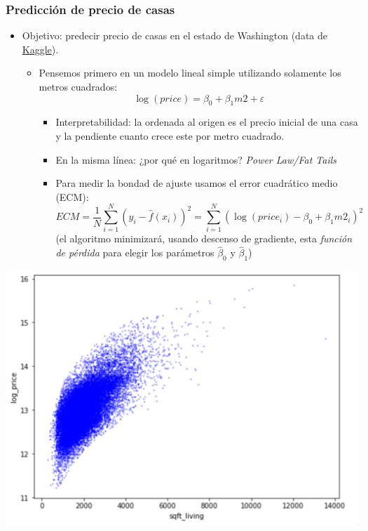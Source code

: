 \documentclass[leqno, 10pt, envcountsect]{beamer}
\numberwithin{equation}{section}
\theoremstyle{definition}
\theoremstyle{example}
\numberwithin{figure}{section}
\numberwithin{table}{section}
\let\olditem\item
\renewcommand{\item}{%
\olditem\vspace{1pt}}
\begin{document}
\begin{frame}
  \frametitle{Predicción de precio de casas}
  \begin{itemize}
    \item Objetivo: predecir precio de casas en el estado de Washington (data de
      \href{https://www.kaggle.com/harlfoxem/housesalesprediction}{Kaggle}).
      \begin{itemize}
        \item Pensemos primero en un modelo lineal simple utilizando solamente
          los metros cuadrados:
          \begin{equation*}
            \log(price) = \beta_{0} + \beta_{1}m2 + \varepsilon
          \end{equation*}
          \begin{itemize}
        \item Interpretabilidad: la ordenada al origen es el precio inicial de
          una casa y la pendiente cuanto crece este por metro cuadrado.
        \item En la misma línea: ¿por qué en logaritmos? \textit{Power Law/Fat
          Tails}
        \item Para medir la bondad de ajuste usamos el error cuadrático
          medio (ECM):
          \begin{equation*}
            ECM = \frac{1}{N} \sum_{i=1}^{N}(y_{i} - \hat{f}(x_{i}))^{2} =
          \sum_{i=1}^{N}(\log(price_{i}) - \beta_{0} + \beta_{1}m2_{i})^{2}
          \end{equation*}
          (el algoritmo minimizará, usando descenso de gradiente, esta
              \textit{función de pérdida} para elegir los parámetros
              $\hat{\beta}_{0}$ y $\hat{\beta}_{1}$)
          \end{itemize}
      \end{itemize}
  \end{itemize}
  \begin{center}
    \includegraphics[scale=0.1]{scatter_regression.png}
  \end{center}

\end{frame}
\end{document}
